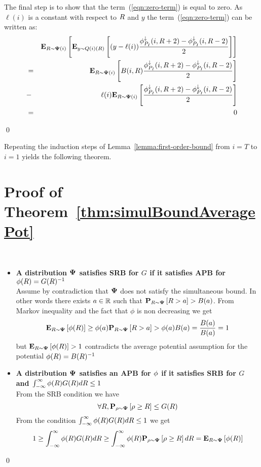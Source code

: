 \documentclass{article}[12pt]
\begin{document}
{\begin{enumerate}
The final step is to show that the term~(\ref{eqn:zero-term}) is equal
to zero. As $\ell(i)$ is a constant with respect to $R$ and $y$ the
term~(\ref{eqn:zero-term}) can be written as:
\begin{eqnarray}
&&{\bf E}_{R \sim {\bf \Psi}(i)}\left[ {\bf E}_{y \sim Q(i)(R)}\left[ (y-\ell(i))
   \frac{\phi_{P_I}^{\downarrow}(i,R+2)-\phi_{P_I}^{\downarrow}(i,R-2)}{2} \right] \right]\\
&=&
{\bf E}_{R \sim {\bf \Psi}(i)}\left[ B(i,R)
    \frac{\phi_{P_I}^{\downarrow}(i,R+2)-\phi_{P_I}^{\downarrow}(i,R-2)}{2} \right]\\
  &-& \ell(i) {\bf E}_{R \sim {\bf \Psi}(i)}\left[ 
    \frac{\phi_{P_I}^{\downarrow}(i,R+2)-\phi_{P_I}^{\downarrow}(i,R-2)}{2} \right]\\
  &=& 0
\end{eqnarray}
\end{enumerate}
\qed

Repeating the induction steps of Lemma~\ref{lemma:first-order-bound}
from $i=T$ to $i=1$ yields the following theorem.

\section{Proof of Theorem~\ref{thm:simulBoundAveragePot} \label{proof:simulBoundAveragePot}}
\proof
~\\
\begin{itemize}
  \item
  {\bf A distribution ${\bf \Psi}$ satisfies SRB for $G$ if it satisfies APB
  for $\phi(R) = G(R)^{-1}$}\\
Assume by contradiction that ${\bf \Psi}$ does not satisfy the simultaneous bound. In
other words there exists $a \in \mathbb{R}$ such that
${\bf P}_{R \sim {\bf \Psi}}\left[ R > a \right] > B(a)$. From Markov inequality and the fact
that $\phi$ is non decreasing we get
\[
  {\bf E}_{R \sim {\bf \Psi}}\left[ \phi(R) \right] \geq \phi(a) {\bf P}_{R \sim {\bf \Psi}}\left[ R > a \right] >
  \phi(a) B(a) = \frac{B(a)}{B(a)}=1
\]
but $ {\bf E}_{R \sim {\bf \Psi}}\left[ \phi(R) \right] >1$ contradicts the average potential
assumption for the potential $\phi(R) = B(R)^{-1}$
\item {\bf A distribution ${\bf \Psi}$ satisfies an
    APB for $\phi$ if it satisfies SRB for $G$ and $\int_{-\infty}^{\infty}\phi(R) G(R) dR \leq 1$}\\
  From the SRB condition we have
  $$\forall R, {\bf P}_{\rho \sim {\bf \Psi}}\left[ \rho \geq R \right] \leq G(R)$$
  From the condition  $\int_{-\infty}^{\infty}\phi(R) G(R) dR \leq 1$ we get
  $$1 \geq \int_{-\infty}^{\infty}\phi(R) G(R) dR \geq
  \int_{-\infty}^{\infty}\phi(R) {\bf P}_{\rho \sim {\bf \Psi}}\left[ \rho\geq R \right]
  dR = {\bf E}_{R \sim {\bf \Psi}}\left[ \phi(R) \right]$$
\end{itemize}
\qed

}
\end{document}
